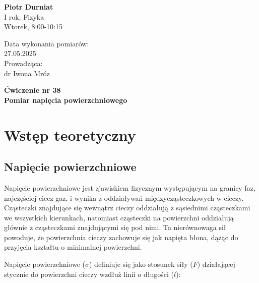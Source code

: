 \documentclass[a4paper,12pt]{article}
\begin{document}
\noindent
\begin{minipage}{0.5\textwidth}
    \raggedright
    \textbf{Piotr Durniat} \\
    I rok, Fizyka \\
    Wtorek, 8:00-10:15 \\
    \vspace{0.5cm}
    \vspace{0.5cm}
\end{minipage}%
\begin{minipage}{0.5\textwidth}
    \raggedleft
    Data wykonania pomiarów: \\
    27.05.2025 \\
    \vspace{0.5cm}
    Prowadząca: \\
    dr Iwona Mróz
\end{minipage}

\vspace{2cm}
\begin{center}
    \LARGE \textbf{Ćwiczenie nr 38} \\[0.5cm]
    \Large \textbf{Pomiar napięcia powierzchniowego}
\end{center}

\vspace{1cm} %
\noindent

\tableofcontents
\newpage

\section{Wstęp teoretyczny}

\subsection{Napięcie powierzchniowe}

Napięcie powierzchniowe jest zjawiskiem fizycznym występującym na granicy faz, najczęściej ciecz-gaz, i wynika z oddziaływań międzycząsteczkowych w cieczy. Cząsteczki znajdujące się wewnątrz cieczy oddziałują z sąsiednimi cząsteczkami we wszystkich kierunkach, natomiast cząsteczki na powierzchni oddziałują głównie z cząsteczkami znajdującymi się pod nimi. Ta nierównowaga sił powoduje, że powierzchnia cieczy zachowuje się jak napięta błona, dążąc do przyjęcia kształtu o minimalnej powierzchni.

Napięcie powierzchniowe ($\sigma$) definiuje się jako stosunek siły ($F$) działającej stycznie do powierzchni cieczy wzdłuż linii o długości ($l$):
\end{document}

